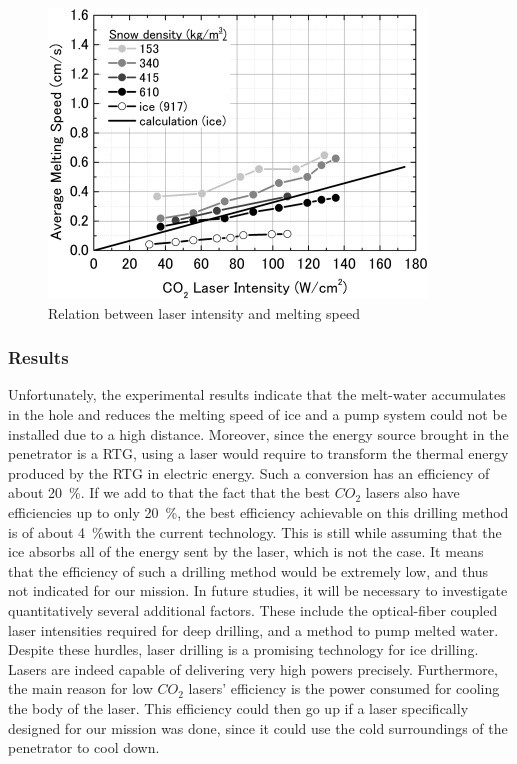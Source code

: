 \begin{figure}[htb]
\centering
\includegraphics[width=.48\textwidth]{figures/laser-drilling/bh2.jpg}
\caption{Relation between laser intensity and melting speed}
\label{fig:bh2}
\end{figure}

\subsubsection{Results}

Unfortunately, the experimental results indicate that the melt-water accumulates in the hole and reduces the melting speed of ice and a pump system could not be installed due to a high distance.
Moreover, since the energy source brought in the penetrator is a RTG, using a laser would require to transform the thermal energy produced by the RTG in electric energy. Such a conversion has an efficiency of about 20~\%. If we add to that the fact that the best $CO_{2}$ lasers also have efficiencies up to only 20~\%, the best efficiency achievable on this drilling method is of about 4~\%with the current technology. This is still while assuming that the ice absorbs all of the energy sent by the laser, which is not the case. It means that the efficiency of such a drilling method would be extremely low, and thus not indicated for our mission.
In future studies, it will be necessary to investigate quantitatively several additional factors. These include the optical-fiber coupled laser intensities required for deep drilling, and a method to pump melted water. Despite these hurdles, laser drilling is a promising technology for ice drilling. Lasers are indeed capable of delivering very high powers precisely. Furthermore, the main reason for low $CO_{2}$ lasers' efficiency is the power consumed for cooling the body of the laser. This efficiency could then go up if a laser specifically designed for our mission was done, since it could use the cold surroundings of the penetrator to cool down.
